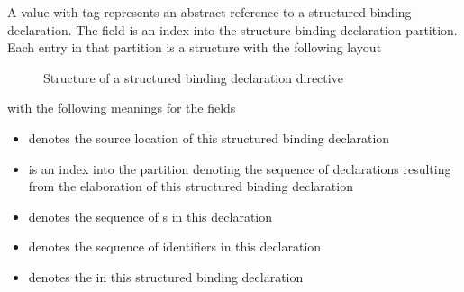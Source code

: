 A  value with tag  represents an abstract reference to a structured binding declaration.
The  field is an index into the structure binding declaration partition.
Each entry in that partition is a structure with the following layout
%
\begin{figure}[H]
    \centering
    \caption{Structure of a structured binding declaration directive}
    \label{fig:ifc:DirSort:StructuredBinding}
\end{figure}
%
with the following meanings for the fields
\begin{itemize}
    \item {} denotes the source location of this structured binding declaration
    \item {} is an index into the  partition denoting the sequence of declarations resulting from the elaboration of this structured binding declaration
    \item {} denotes the sequence of s in this declaration
    \item {} denotes the sequence of identifiers in this declaration
    \item {} denotes the  in this structured binding declaration
\end{itemize}



\subsection{}
\label{sec:ifc:DirSort:SpecifiersSpread}

